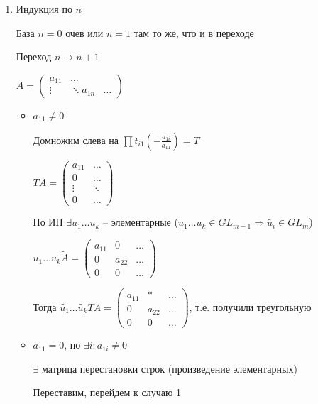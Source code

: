 \documentclass[12pt]{article}
\begin{document}
\begin{enumerate}
    \item Индукция по $n$
    
    База $n = 0$ очев или $n = 1$ там то же, что и в переходе

    Переход $n \to n + 1$

    $A = \begin{pmatrix}
        a_{11} & \ldots \\
        \vdots & \ddots
        a_{1n} & \ldots
    \end{pmatrix}$

    \begin{itemize}
        \item $a_{11} \neq 0$
        
        Домножим слева на $\prod t_{i1}(- \frac{a_{1i}}{a_{11}}) = T$

        $TA = \begin{pmatrix}
            a_{11} & \ldots \\
            0 & \ldots \\
            \vdots & \ddots \\
            0 & \ldots
        \end{pmatrix}$

        По ИП $\exists u_1 \ldots u_k$ -- элементарные ($u_1 \ldots u_k \in GL_{m - 1} \Rightarrow \tilde{u_i} \in GL_m$)

        $u_1 \ldots u_k \tilde{A} = \begin{pmatrix}
            a_{11} & 0 & \ldots \\
            0 & a_{22} & \ldots \\
            0 & 0 & \ldots
        \end{pmatrix}$

        Тогда $\tilde{u_1} \ldots \tilde{u_k}TA = \begin{pmatrix}
            a_{11} & * & \ldots \\
            0 & a_{22} & \ldots \\
            0 & 0 & \ldots
        \end{pmatrix}$, т.е. получили треугольную

        \item $a_{11} = 0$, но $\exists i : a_{1i} \neq 0$
        
        $\exists$ матрица перестановки строк (произведение элементарных)

        Переставим, перейдем к случаю 1


\end{itemize}
\end{enumerate}
\end{document}
